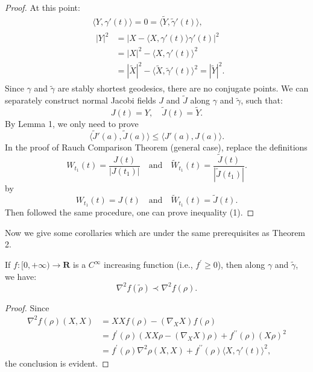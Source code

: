 \documentclass{ctexart}
\begin{document}
\begin{proof}[Proof]
  At this point:
  $$
  \begin{aligned}
  & \langle Y, \gamma'(t)\rangle = 0 = \langle\widetilde{Y}, \tilde{\gamma}'(t)\rangle, \\
  &\begin{aligned}
    |Y|^2 
    &= |X-\langle X, \gamma'(t)\rangle \gamma'(t)|^2 \\
    &= |X|^2-\langle X, \gamma'(t)\rangle^2 \\
    &= |\widetilde{X}|^2-\langle\widetilde{X}, \widetilde{\gamma}'(t)\rangle^2=|\widetilde{Y}|^2 .
    \end{aligned}
  \end{aligned}
  $$
  Since $\gamma$ and $\widetilde{\gamma}$ are stably shortest geodesics, there are no conjugate points. 
  We can separately construct normal Jacobi fields $J$ and $\widetilde{J}$ along $\gamma$ and $\widetilde{\gamma}$, such that:
  $$
  J(t) = Y, \quad \widetilde{J}(t) = \widetilde{Y}.
  $$
  By Lemma 1, we only need to prove 
  \begin{equation}
    \langle \tilde{J}'\left(a\right),\tilde{J}\left(a\right)\rangle \leq \langle J'\left(a\right),J\left(a\right)\rangle. 
  \end{equation}
  In the proof of Rauch Comparison Theorem (general case), replace the definitions 
  $$
  W_{t_1}(t) = \frac{J(t)}{\left|J(t_1)\right|} \quad \text{and} \quad \tilde{W}_{t_1}(t) = \frac{\tilde{J}(t)}{\left|\tilde{J}(t_1)\right|}.
  $$
  by
  $$
  W_{t_1}(t) = J(t) \quad \text{and} \quad \tilde{W}_{t_1}(t) = \tilde{J}(t).
  $$
  Then followed the same procedure, one can prove inequality (1).
\end{proof}

Now we give some corollaries which are under the same prerequisites as Theorem 2.
\begin{corollary}
  If $f:[0, +\infty) \rightarrow \mathbf{R}$ is a $C^\infty$ increasing function (i.e., $f^\prime \geq 0$), then along $\gamma$ and $\widetilde{\gamma}$, we have:
  $$
  \nabla^2 f(\widetilde{\rho}) \prec  \nabla^2 f(\rho).
  $$  
\end{corollary}
\begin{proof}[Proof]
  Since
  $$
  \begin{aligned}
  \nabla^2 f(\rho)(X, X) & = X X f(\rho) - \left(\nabla_X X\right) f(\rho) \\
  & = f^\prime(\rho) \left(X X \rho - \left(\nabla_X X\right) \rho\right) + f^{\prime \prime}(\rho)(X \rho)^2 \\
  & = f^\prime(\rho) \nabla^2 \rho(X, X) + f^{\prime \prime}(\rho)\langle X, \gamma'(t)\rangle^2,
  \end{aligned}
  $$
  the conclusion is evident.
\end{proof}
\end{document}
